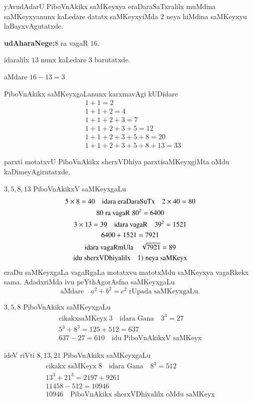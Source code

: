 yAvudAdarU PiboVnAkikx saMKeyxya eraDaraSaTxralilx muMdina saMKeyxyanunx kaLedare datatx saMKeyxyiMda $2$ neya hiMdina saMKeyxyu laBayxvAgutatxde.

\textbf{udAharaNege:}\quad $8$ ra vagaR $16$.

idaralilx $13$ nunx  kaLedare $3$ barutatxde.

aMdare $16-13 =3$

PiboVnAkikx saMKeyxgaLanunx karxmavAgi kUDidare
\begin{align*}
&1+1=2\\
&1+1+2=4\\
&1+1+2+3=7\\
&1+1+2+3+5=12\\
&1+1+2+3+5+8=20\\
&1+1+2+3+5+8+13=33
\end{align*}

parxti motatxvU PiboVnAkikx sherxVDhiya parxtisaMKeyxgiMta oMdu kaDimeyAgirutatxde.

$3,5,8,13$ PiboVnAkikxV saMKeyxgaLu
\begin{gather*}
5\times 8 =40 \quad \text{idara eraDaraSuTx} \quad 2\times 40 = 80\\
80 \;\text{ra vagaR}\; 80^2 = 6400\\
3\times 13 =39 \quad \text{idara vagaR} \quad 39^2 = 1521\\
6400+1521 = 7921 \\
\text{idara vagaRmUla} \quad\sqrt{7921} =89\\
\text{idu sherxVDhiyalilx}\quad {\rm 1)}\;\text{neya saMKeyx} 
\end{gather*}
eraDu saMKeyxgaLa vagaRgaLa motatxvu matotxMdu saMKeyxya vagaRkekx sama. AdadxriMda ivu peYthAgorAsfna saMKeyxgaLu
$$
\text{aMdare}\quad a^2+b^2=c^2 \;\text{rUpada saMKeyxgaLu.}
$$

$3,5,8$ PiboVnAkikx saMKeyxgaLu
\begin{gather*}
\text{cikakxsaMKeyx}\; 3 \quad \text{idara Gana} \quad 3^3 = 27\\
5^{3}+8^{3} = 125+512 = 637\\
637-27 = 610 \quad\text{idu PiboVnAkikxV saMKeyx}
\end{gather*}

ideV riVti $8,13,21$ PiboVnAkikx saMKeyxgaLu
\begin{gather*}
\text{cikakx saMKeyx}\;8 \quad \text{idara Gana} \quad 8^3=512\\
13^3+21^3 = 2197+9261\\
11458-512 = 10946\\
10946 \quad\text{PiboVnAkikx sherxVDhiyalilx oMdu saMKeyx} 
\end{gather*}


